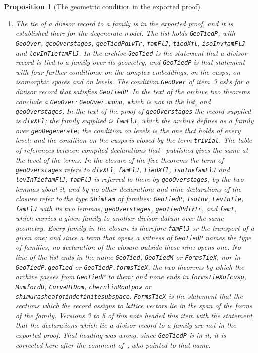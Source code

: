 \documentclass[11pt]{article}
\newtheorem{proposition}[theorem]{Proposition}
\theoremstyle{definition}
\theoremstyle{remark}
\DeclareRobustCommand{\lean}[1]{{\renewcommand{\_}{\textunderscore\allowbreak}\texttt{#1}}}
\begin{document}
\begin{proposition}[The geometric condition in the exported proof]
\begin{enumerate}[leftmargin=2em,itemsep=1pt]
\item \emph{The tie of a divisor record to a family is in the exported proof, and it is established there for the degenerate model.} The list holds \lean{GeoTiedP}, with \lean{GeoOver}, \lean{geoOver\_stages}, \lean{geoTiedP\_divTr}, \lean{famFlJ}, \lean{tiedX\_fl}, \lean{isoInv\_famFlJ} and \lean{levInTie\_famFlJ}. In the archive \lean{GeoTied} is the statement that a divisor record is tied to a family over its geometry, and \lean{GeoTiedP} is that statement with four further conditions: on the complex embeddings, on the cusps, on isomorphic spaces and on levels. The condition \lean{GeoOver} of item~3 asks for a divisor record that satisfies \lean{GeoTiedP}. In the text of the archive two theorems conclude a \lean{GeoOver}: \lean{GeoOver.mono}, which is not in the list, and \lean{geoOver\_stages}. In the text of the proof of \lean{geoOver\_stages} the record supplied is \lean{divXFl}; the family supplied is \lean{famFlJ}, which the archive defines as a family over \lean{geoDegenerate}; the condition on levels is the one that holds of every level; and the condition on the cusps is closed by the term \lean{trivial}. The table of references between compiled declarations that~\citet{shore} published gives the same at the level of the terms. In the closure of the five theorems the term of \lean{geoOver\_stages} refers to \lean{divXFl}, \lean{famFlJ}, \lean{tiedX\_fl}, \lean{isoInv\_famFlJ} and \lean{levInTie\_famFlJ}; \lean{famFlJ} is referred to there by \lean{geoOver\_stages}, by the two lemmas about it, and by no other declaration; and nine declarations of the closure refer to the type \lean{ShimFam} of families: \lean{GeoTiedP}, \lean{IsoInv}, \lean{LevInTie}, \lean{famFlJ} with its two lemmas, \lean{geoOver\_stages}, \lean{geoTiedP\_divTr}, and \lean{famT}, which carries a given family to another divisor datum over the same geometry. Every family in the closure is therefore \lean{famFlJ} or the transport of a given one; and since a term that opens a witness of \lean{GeoTiedP} names the type of families, no declaration of the closure outside these nine opens one. No line of the list ends in the name \lean{GeoTied}, \lean{GeoTiedM} or \lean{FormsTieX}, nor in \lean{GeoTiedP.geoTied} or \lean{GeoTiedP.formsTieX}, the two theorems by which the archive passes from \lean{GeoTiedP} to them; and none ends in \lean{formsTieX\_of\_cusp}, \lean{MumfordU}, \lean{CurveHTDom}, \lean{chern\_linRoot\_pow} or \lean{shimura\_sheaf\_of\_indefinite\_subspace}. \lean{FormsTieX} is the statement that the sections which the record assigns to lattice vectors lie in the span of the forms of the family. Versions 3 to 5 of this note headed this item with the statement that the declarations which tie a divisor record to a family are not in the exported proof. That heading was wrong, since \lean{GeoTiedP} is in it; it is corrected here after the comment of~\citet{dixitcomment}, who pointed to that name.

\end{enumerate}
\end{proposition}
\end{document}
